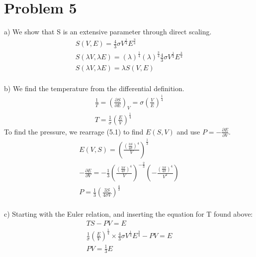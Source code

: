 \documentclass[a4paper,10pt]{article}
\numberwithin{equation}{section}
\begin{document}
\section{Problem 5}
a) We show that S is an extensive parameter through direct scaling.
\begin{gather}
 S(V,E)=\frac{4}{3}\sigma V^{\frac{1}{4}}E^{\frac{3}{4}}\\
 S(\lambda V, \lambda E) = (\lambda)^{\frac{1}{4}}(\lambda)^{\frac{3}{4}}
 \frac{4}{3}\sigma V^{\frac{1}{4}}E^{\frac{3}{4}}\\
  S(\lambda V, \lambda E) = \lambda S(V,E)
\end{gather}
\\ 
b) We find the temperature from the differential definition.
\begin{gather}
 \frac{1}{T}=\left (\frac{\partial S}{\partial E} \right )_V=
    \sigma\left ( \frac{V}{E} \right )^{\frac{1}{4}}\\
 T = \frac{1}{\sigma} \left(\frac{E}{V} \right)^{\frac{1}{4}}
\end{gather}
To find the pressure, we rearrage (5.1) to find $E(S,V)$ and use $P=-\frac{\partial E}{\partial V}$.
\begin{gather}
 E(V,S) = \left(\frac{(\frac{3S}{4\sigma})^4}{V} \right)^{\frac{1}{3}}\\
 -\frac{\partial E}{\partial V}=-\frac{1}{3}\left(\frac{(\frac{3S}{4\sigma})^4}{V} \right)^{-\frac{2}{3}}
 \left(-\frac{(\frac{3S}{4\sigma})^4}{V^2} \right)\\
 P=\frac{1}{3}\left(\frac{3S}{4\sigma V} \right)^{\frac{4}{3}}
\end{gather}
\\
c) Starting with the Euler relation, and inserting the equation for T found above:
\begin{gather}
 TS-PV=E\\
 \frac{1}{\sigma} \left(\frac{E}{V} \right)^{\frac{1}{4}} \times \frac{4}{3}\sigma V^{\frac{1}{4}}E^{\frac{3}{4}}
 -PV = E\\
 PV = \frac{1}{3}E
\end{gather}
\end{document}
